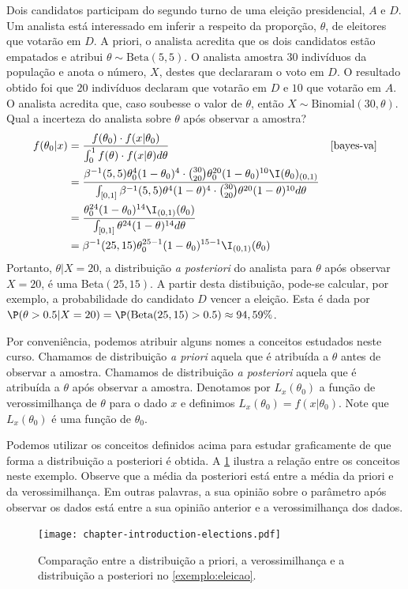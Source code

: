 \begin{example}
 \label{exemplo:eleicao}
 Dois candidatos participam do segundo turno de
 uma eleição presidencial, $A$ e $D$.
 Um analista está interessado em inferir a 
 respeito da proporção, $\theta$, de
 eleitores que votarão em $D$.
 A priori, o analista acredita que 
 os dois candidatos estão empatados e 
 atribui $\theta \sim \text{Beta}(5, 5)$.
 O analista amostra $30$ indivíduos da população e 
 anota o número, $X$, destes que 
 declararam o voto em $D$.
 O resultado obtido foi que 
 $20$ indivíduos declaram que votarão em $D$ e
 $10$ que votarão em $A$.
 O analista acredita que, 
 caso soubesse o valor de $\theta$,
 então $X \sim \text{Binomial}(30, \theta)$.
 Qual a incerteza do analista sobre 
 $\theta$ após observar a amostra?
 \begin{align*}
  f(\theta_{0}|x)	
  &= \frac{f(\theta_{0}) \cdot f(x|\theta_{0})}
  {\int_{0}^1{f(\theta) \cdot f(x|\theta)d\theta}}
  & \Cref{bayes-va}	\\
  &= \frac{\beta^{-1}(5,5)\theta_{0}^{4}(1-\theta_{0})^{4}
  \cdot {30 \choose 20}\theta_{0}^{20}(1-\theta_{0})^{10}\I(\theta_{0})_{(0,1)}}{\int_{[0,1]}{\beta^{-1}(5,5)\theta^{4}(1-\theta)^{4} \cdot {30 \choose 20}\theta^{20}(1-\theta)^{10}} d\theta} \\
  &= \frac{\theta_{0}^{24}(1-\theta_{0})^{14}\I_{(0,1)}(\theta_{0})}{\int_{[0,1]}\theta^{24}(1-\theta)^{14} d\theta} \\
  &= \beta^{-1}(25,15)\theta_{0}^{25-1}(1-\theta_{0})^{15-1}\I_{(0,1)}(\theta_{0})
 \end{align*}
 Portanto, $\theta|X=20$, a distribuição 
 \emph{a posteriori} do analista para 
 $\theta$ após observar $X=20$, é
 uma Beta$(25,15)$.
 A partir desta distibuição, pode-se calcular, por exemplo, a probabilidade do candidato $D$ vencer a eleição. Esta é dada por $\P(\theta>0.5|X=20)=\P(\mbox{Beta}(25,15)>0.5) \approx 94,59\%$.

 Por conveniência, podemos atribuir alguns 
 nomes a conceitos estudados neste curso.
 Chamamos de distribuição \emph{a priori} aquela que
 é atribuída a $\theta$ antes de observar a amostra.
 Chamamos de distribuição \emph{a posteriori} aquela que
 é atribuída a $\theta$ após observar a amostra.
 Denotamos por $L_{x}(\theta_{0})$ a
 função de verossimilhança de $\theta$ para
 o dado $x$ e definimos 
 $L_{x}(\theta_{0}) = f(x|\theta_{0})$.
 Note que $L_{x}(\theta_{0})$ é
 uma função de $\theta_{0}$.

 Podemos utilizar os conceitos definidos acima para
 estudar graficamente de que forma a
 distribuição a posteriori é obtida.
 A \cref{figura:eleicao} ilustra a
 relação entre os conceitos neste exemplo.
 Observe que a média da posteriori está entre
 a média da priori e da verossimilhança.
 Em outras palavras, a sua opinião sobre
 o parâmetro após observar os dados está entre
 a sua opinião anterior e a verossimilhança dos dados.
 \begin{figure}
  \centering
  \texttt{[image: chapter-introduction-elections.pdf]}
  \caption{Comparação entre a distribuição a priori,
  a verossimilhança e a distribuição a posteriori no
  \cref{exemplo:eleicao}.}
  \label{figura:eleicao}
 \end{figure}
\end{example}

